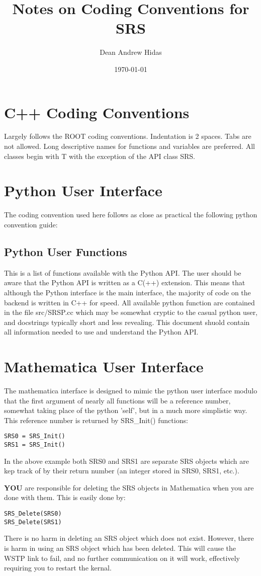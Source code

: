 \documentclass{article}
\title{Notes on Coding Conventions for SRS}
\author{Dean Andrew Hidas}
\date{\today}
\begin{document}
\maketitle

\section{C++ Coding Conventions}
Largely follows the ROOT coding conventions.  Indentation is 2 spaces.  Tabs are not allowed.  Long descriptive names for functions and variables are preferred.  All classes begin with T with the exception of the API class SRS.


\section{Python User Interface}
The coding convention used here follows as close as practical the following python convention guide:

\subsection{Python User Functions}
This is a list of functions available with the Python API.  The user should be aware that the Python API is written as a C(++) extension.  This means that although the Python interface is the main interface, the majority of code on the backend is written in C++ for speed.  All available python function are contained in the file src/SRSP.cc which may be somewhat cryptic to the casual python user, and docstrings typically short and less revealing.  This document shuold contain all information needed to use and understand the Python API.


\section{Mathematica User Interface}
The mathematica interface is designed to mimic the python user interface modulo that the first argument of nearly all functions will be a reference number, somewhat taking place of the python 'self', but in a much more simplistic way.  This reference number is returned by SRS\_Init() functions:
\begin{verbatim}
SRS0 = SRS_Init()
SRS1 = SRS_Init()
\end{verbatim}
In the above example both SRS0 and SRS1 are separate SRS objects which are kep track of by their return number (an integer stored in SRS0, SRS1, etc.).

{\bf YOU} are responsible for deleting the SRS objects in Mathematica when you are done with them.  This is easily done by:
\begin{verbatim}
SRS_Delete(SRS0)
SRS_Delete(SRS1)
\end{verbatim}
There is no harm in deleting an SRS object which does not exist.  However, there is harm in using an SRS object which has been deleted.  This will cause the WSTP link to fail, and no further communication on it will work, effectively requiring you to restart the kernal.
\end{document}
